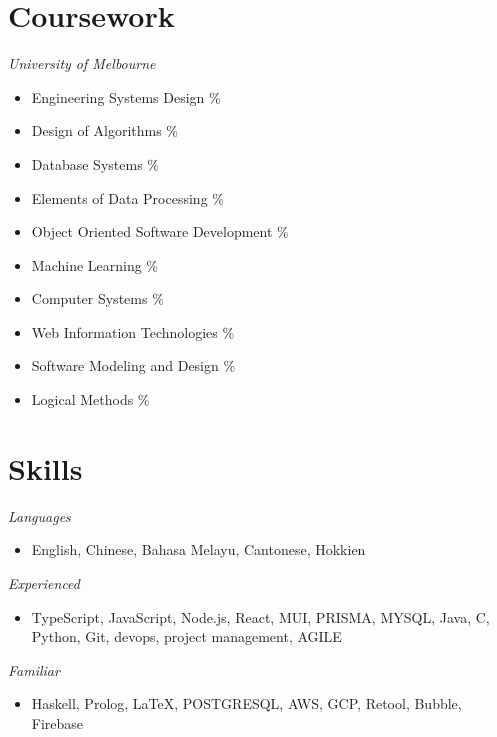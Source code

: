 \documentclass[10pt, a4paper]{cv}
\begin{document}
\begin{paracol}{2}
\begin{flushleft}
		\section*{Coursework}
		 {\sl University of Melbourne}
		\begin{itemize} \itemsep -2pt
			\item Engineering Systems Design \%
			\item Design of Algorithms \%
			\item Database Systems \%
			\item Elements of Data Processing \%
			\item Object Oriented Software Development \%
			\item Machine Learning \%
			\item Computer Systems \%
			\item Web Information Technologies \%
			\item Software Modeling and Design \%
			\item Logical Methods \%
		\end{itemize}

		\section*{Skills}
		 {\sl Languages}
		\begin{itemize}[label={}, leftmargin=1em, topsep=0pt, after=\vspace{6pt}]
			\item English, Chinese, Bahasa Melayu, Cantonese, Hokkien
		\end{itemize}
		{\sl Experienced}
		\begin{itemize}[label={}, leftmargin=1em,  topsep=0pt, after=\vspace{6pt}]
			\item TypeScript, JavaScript, Node.js, React, MUI, PRISMA, MYSQL, Java, C, Python, Git, devops, project management, AGILE
		\end{itemize}
		{\sl Familiar}
		\begin{itemize}[label={}, leftmargin=1em, topsep=0pt]
			\item Haskell, Prolog, \LaTeX, POSTGRESQL, AWS, GCP, Retool, Bubble, Firebase
		\end{itemize}

		\switchcolumn


\end{flushleft}
\end{paracol}
\end{document}
